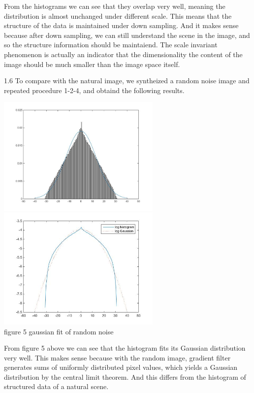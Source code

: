 \documentclass[12pt]{article}
\newenvironment{problem}[2][Problem]{\begin{trivlist}
\item[\hskip \labelsep {\bfseries #1}\hskip \labelsep {\bfseries #2}]}{\end{trivlist}}
\begin{document}
\begin{problem}{1. High Kurtosis and Scale Invariance}
\begin{center}
\end{center}
From the histograms we can see that they overlap very well, meaning the distribution is almost unchanged under different scale. This means that the structure of the data is maintained under down sampling. And it makes sense because after down sampling, we can still understand the scene in the image, and so the structure information should be maintaiend. The scale invariant phenomenon is actually an indicator that the dimensionality the content of the image should be much smaller than the image space itself.\\
\item{1.6}
To compare with the natural image, we syntheized a random noise image and repeated procedure 1-2-4, and obtaind the following results.
\begin{center}
		\includegraphics[width=8cm]{results/1_7_randm_superimpose.jpg}
		\includegraphics[width=8cm]{results/1_7_randm_superimpose_log.jpg}{\\figure 5 gaussian fit of random noise}
\end{center}
From figure 5 above we can see that the histogram fits its Gaussian distribution very well. This makes sense because with the random image, gradient filter generates sums of uniformly distributed pixel values, which yields a Gaussian distribution by the central limit theorem. And this differs from the histogram of structured data of a natural scene.\\
\end{problem}
\end{document}

